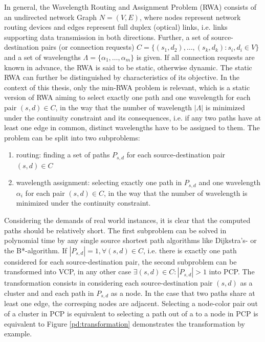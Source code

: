 In general, the Wavelength Routing and Assignment Problem (RWA) consists of an undirected network Graph $N=(V,E)$, where nodes represent network routing devices and edges represent full duplex (optical) links, i.e. links supporting data transmission in both directions. Further, a set of source-destination pairs (or connection requests) $C=\{(s_1,d_2),\ldots , (s_k, d_k) : s_i,d_i \in V\}$ and a set of wavelengths $\Lambda = \{\alpha_1 , \ldots, \alpha_m \}$ is given. If all connection requests are known in advance, the RWA is said to be static, otherwise dynamic. \cite{murthy-02} The static RWA can further be distinguished by characteristics of its objective. In the context of this thesis, only the min-RWA problem is relevant, which is a static version of RWA aiming to select exactly one path and one wavelength for each pair $(s,d) \in C$, in the way that the number of wavelength $\left\vert{\Lambda}\right\vert$ is minimized under the continuity constraint and its consequences, i.e. if any two paths have at least one edge in common, distinct wavelengths have to be assigned to them. The problem can be split into two subproblems:

\begin{enumerate}
\item routing: finding a set of paths $P_{s,d}$ for each source-destination pair $(s,d) \in C$
\item wavelength assignment: selecting exactly one path in $P_{s,d}$ and one wavelength $\alpha_i$ for each pair $(s,d) \in C$, in the way that the number of wavelength is minimized under the continuity constraint.
\end{enumerate}

Considering the demands of real world instances, it is clear that the computed paths should be relatively short. The first subproblem can be solved in polynomial time by any single source shortest path algorithms like Dijkstra's- or the B*-algorithm. If $\left\vert{P_{s,d}}\right\vert = 1, \forall (s,d)\in C$, i.e. there is exactly one path considered for each source-destination pair, the second subproblem can be transformed into VCP, in any other case $\exists (s,d)\in C : \left\vert{P_{s,d}}\right\vert > 1$ into PCP. The transformation consists in considering each source-destination pair $(s,d)$ as a cluster and and each path in $P_{s,d}$ as a node. In the case that two paths share at least one edge, the corresping nodes are adjacent. Selecting a node-color pair out of a cluster in PCP is equivalent to selecting a path out of a  to a node in PCP is equivalent to Figure \ref{pd:transformation} demonstrates the transformation by example.


